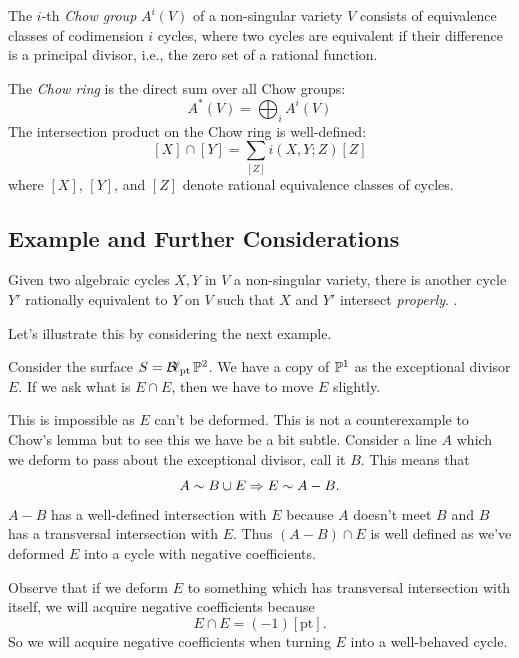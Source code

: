 \documentclass[12pt]{memoir}
\begin{document}
\begin{Def}
The \( i \)-th \emph{Chow group} \( A^i(V) \) of a non-singular variety \( V \) consists of equivalence classes of codimension \( i \) cycles, where two cycles are equivalent if their difference is a principal divisor, i.e., the zero set of a rational function.
\end{Def}

The \emph{Chow ring} is the direct sum over all Chow groups:
\[
A^\ast(V) = \bigoplus_i A^i(V)
\]
The intersection product on the Chow ring is well-defined:
\[
[X] \cap [Y] = \sum_{[Z]} i(X, Y; Z) [Z]
\]
where \( [X] \), \( [Y] \), and \( [Z] \) denote rational equivalence classes of cycles.

\subsection{Example and Further Considerations}

\begin{Lem}
Given two algebraic cycles $X,Y$ in $V$ a non-singular variety, there is another cycle $Y'$ rationally equivalent to $Y$ on $V$ such that $X$ and $Y'$ intersect \emph{properly}. .
\end{Lem}

Let's illustrate this by considering the next example.

\begin{Ex}
    Consider the surface $S=\operatorname{\mathcal{B}\!\ell}_{\text{pt}}\mathbb{P}^2$. We have a copy of $\mathbb{P}^1$ as the exceptional divisor $E$. If we ask what is $E\cap E$, then we have to move $E$ slightly.\par
    This is impossible as $E$ can't be deformed. This is not a counterexample to Chow's lemma but to see this we have be a bit subtle. Consider a line $A$ which we deform to pass about the exceptional divisor, call it $B$. This means that 
    $$A\sim B\cup E\Rightarrow E\sim A-B.$$
    $A-B$ has a well-defined intersection with $E$ because $A$ doesn't meet $B$ and $B$ has a transversal intersection with $E$. Thus $(A-B)\cap E$ is well defined as we've deformed $E$ into a cycle with negative coefficients.\par
    Observe that if we deform $E$ to something which has transversal intersection with itself, we will acquire negative coefficients because 
    $$E\cap E=(-1)[\text{pt}].$$
    So we will acquire negative coefficients when turning $E$ into a well-behaved cycle.
\end{Ex}
\end{document}
